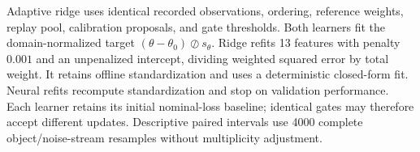 \documentclass[12pt,a4paper]{article}
\begin{document}
Adaptive ridge uses identical recorded observations, ordering, reference
weights, replay pool, calibration proposals, and gate thresholds. Both
learners fit the domain-normalized target $(\theta-\theta_0)\oslash s_\theta$.
Ridge refits 13 features with penalty $0.001$ and an unpenalized intercept,
dividing weighted squared error by total weight. It retains offline
standardization and uses a deterministic closed-form fit. Neural refits
recompute standardization and stop on validation performance. Each learner
retains its initial nominal-loss baseline; identical gates may therefore
accept different updates. Descriptive paired intervals use 4000 complete
object/noise-stream resamples without multiplicity adjustment.
\end{document}
